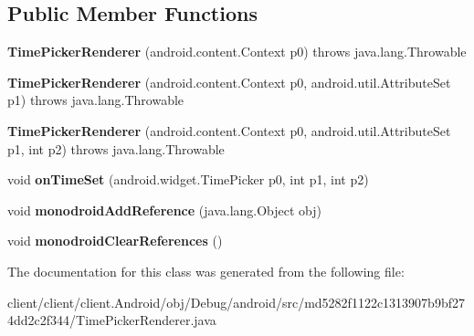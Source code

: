 \subsection*{Public Member Functions}
\begin{DoxyCompactItemize}
\item 
\hypertarget{classmd5282f1122c1313907b9bf274dd2c2f344_1_1TimePickerRenderer_a3bb3ec3ba5ee9e2a5e244d0705b893ee}{}{\bfseries Time\+Picker\+Renderer} (android.\+content.\+Context p0)  throws java.\+lang.\+Throwable 	\label{classmd5282f1122c1313907b9bf274dd2c2f344_1_1TimePickerRenderer_a3bb3ec3ba5ee9e2a5e244d0705b893ee}

\item 
\hypertarget{classmd5282f1122c1313907b9bf274dd2c2f344_1_1TimePickerRenderer_a88566389c6c48dd34053dfcd34420afb}{}{\bfseries Time\+Picker\+Renderer} (android.\+content.\+Context p0, android.\+util.\+Attribute\+Set p1)  throws java.\+lang.\+Throwable 	\label{classmd5282f1122c1313907b9bf274dd2c2f344_1_1TimePickerRenderer_a88566389c6c48dd34053dfcd34420afb}

\item 
\hypertarget{classmd5282f1122c1313907b9bf274dd2c2f344_1_1TimePickerRenderer_ad248b4d7988e4db68bedabf91b3c4a75}{}{\bfseries Time\+Picker\+Renderer} (android.\+content.\+Context p0, android.\+util.\+Attribute\+Set p1, int p2)  throws java.\+lang.\+Throwable 	\label{classmd5282f1122c1313907b9bf274dd2c2f344_1_1TimePickerRenderer_ad248b4d7988e4db68bedabf91b3c4a75}

\item 
\hypertarget{classmd5282f1122c1313907b9bf274dd2c2f344_1_1TimePickerRenderer_a4365bffe5760edcdd56bc02e9d7d6744}{}void {\bfseries on\+Time\+Set} (android.\+widget.\+Time\+Picker p0, int p1, int p2)\label{classmd5282f1122c1313907b9bf274dd2c2f344_1_1TimePickerRenderer_a4365bffe5760edcdd56bc02e9d7d6744}

\item 
\hypertarget{classmd5282f1122c1313907b9bf274dd2c2f344_1_1TimePickerRenderer_a68c4c6e162484501e9f4e2d11b29e3d9}{}void {\bfseries monodroid\+Add\+Reference} (java.\+lang.\+Object obj)\label{classmd5282f1122c1313907b9bf274dd2c2f344_1_1TimePickerRenderer_a68c4c6e162484501e9f4e2d11b29e3d9}

\item 
\hypertarget{classmd5282f1122c1313907b9bf274dd2c2f344_1_1TimePickerRenderer_a522968de558ec44b8f9ec94f72d7fd38}{}void {\bfseries monodroid\+Clear\+References} ()\label{classmd5282f1122c1313907b9bf274dd2c2f344_1_1TimePickerRenderer_a522968de558ec44b8f9ec94f72d7fd38}

\end{DoxyCompactItemize}


The documentation for this class was generated from the following file\+:\begin{DoxyCompactItemize}
\item 
client/client/client.\+Android/obj/\+Debug/android/src/md5282f1122c1313907b9bf274dd2c2f344/Time\+Picker\+Renderer.\+java\end{DoxyCompactItemize}
